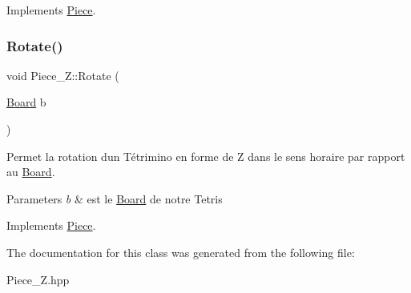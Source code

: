 Implements \hyperlink{classPiece_a56cdf7f4234fe848a3e203b693b7a862}{Piece}.

\mbox{\label{classPiece__Z_a50d6c34030c7641b4827353b9b82a68e}} 
\subsubsection{\texorpdfstring{Rotate()}{Rotate()}}
{\footnotesize\ttfamily void Piece\+\_\+\+Z\+::\+Rotate (\begin{DoxyParamCaption}\item[{\hyperlink{classBoard}{Board}}]{b }\end{DoxyParamCaption})\hspace{0.3cm}{\ttfamily [virtual]}}



Permet la rotation d\textquotesingle{}un Tétrimino en forme de Z dans le sens horaire par rapport au \hyperlink{classBoard}{Board}. 


\begin{DoxyParams}{Parameters}
{\em b} & est le \hyperlink{classBoard}{Board} de notre Tetris \\
\hline
\end{DoxyParams}


Implements \hyperlink{classPiece_a078f3cc6281cb8f60af3ae2266c651ba}{Piece}.



The documentation for this class was generated from the following file\+:\begin{DoxyCompactItemize}
\item 
Piece\+\_\+\+Z.\+hpp\end{DoxyCompactItemize}
